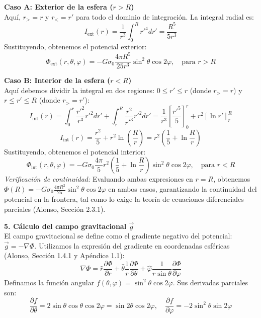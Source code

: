 \documentclass[a4paper]{article}
\begin{document}
\textbf{Caso A: Exterior de la esfera ($r > R$)} \\
Aquí, $r_{>} = r$ y $r_{<} = r'$ para todo el dominio de integración. La integral radial es:
$$
I_{\text{ext}}(r) = \frac{1}{r^3} \int_0^R r'^4 dr' = \frac{R^5}{5r^3}
$$
Sustituyendo, obtenemos el potencial exterior:
$$
\Phi_{\text{ext}}(r, \theta, \varphi) = -G \sigma_0 \frac{4\pi R^5}{25 r^3} \sin^2\theta \cos 2\varphi, \quad \text{para } r > R
$$

\textbf{Caso B: Interior de la esfera ($r < R$)} \\
Aquí debemos dividir la integral en dos regiones: $0 \leq r' \leq r$ (donde $r_{>} = r$) y $r \leq r' \leq R$ (donde $r_{>} = r'$):
$$
I_{\text{int}}(r) = \int_0^r \frac{r'^2}{r^3} r'^2 dr' + \int_r^R \frac{r^2}{r'^3} r'^2 dr' = \frac{1}{r^3} \left[ \frac{r'^5}{5} \right]_0^r + r^2 \left[ \ln r' \right]_r^R
$$
$$
I_{\text{int}}(r) = \frac{r^2}{5} + r^2 \ln\left(\frac{R}{r}\right) = r^2 \left( \frac{1}{5} + \ln\frac{R}{r} \right)
$$
Sustituyendo, obtenemos el potencial interior:
$$
\Phi_{\text{int}}(r, \theta, \varphi) = -G \sigma_0 \frac{4\pi}{5} r^2 \left( \frac{1}{5} + \ln\frac{R}{r} \right) \sin^2\theta \cos 2\varphi, \quad \text{para } r < R
$$
\textit{Verificación de continuidad:} Evaluando ambas expresiones en $r=R$, obtenemos $\Phi(R) = -G \sigma_0 \frac{4\pi R^2}{25} \sin^2\theta \cos 2\varphi$ en ambos casos, garantizando la continuidad del potencial en la frontera, tal como lo exige la teoría de ecuaciones diferenciales parciales (Alonso, Sección 2.3.1).

\vspace{0.3cm}
\noindent\textbf{5. Cálculo del campo gravitacional $\vec{g}$} \\
El campo gravitacional se define como el gradiente negativo del potencial: $\vec{g} = -\nabla \Phi$. Utilizamos la expresión del gradiente en coordenadas esféricas (Alonso, Sección 1.4.1 y Apéndice 1.1):
$$
\nabla \Phi = \hat{r} \frac{\partial \Phi}{\partial r} + \hat{\theta} \frac{1}{r} \frac{\partial \Phi}{\partial \theta} + \hat{\varphi} \frac{1}{r \sin\theta} \frac{\partial \Phi}{\partial \varphi}
$$
Definamos la función angular $f(\theta, \varphi) = \sin^2\theta \cos 2\varphi$. Sus derivadas parciales son:
$$
\frac{\partial f}{\partial \theta} = 2\sin\theta\cos\theta \cos 2\varphi = \sin 2\theta \cos 2\varphi, \quad \frac{\partial f}{\partial \varphi} = -2\sin^2\theta \sin 2\varphi
$$
\end{document}
